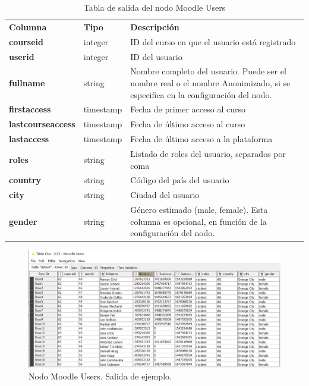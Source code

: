 \begin{table}[!h]
	\begin{center}
		\begin{tabular}{p{}p{}p{}}
			\toprule
			\textbf{Columna} & \textbf{Tipo} & \textbf{Descripción}\\
			\otoprule
			\textbf{courseid} & integer & ID del curso en que el usuario está registrado\\
         \hline
			\textbf{userid} & integer & ID del usuario \\
         \hline
         \textbf{fullname} & string & Nombre completo del usuario. Puede ser el nombre real o el nombre Anonimizado, si se especifica en la configuración del nodo. \\
         \hline
         \textbf{firstaccess} & timestamp & Fecha de primer acceso al curso \\
         \hline
         \textbf{lastcourseaccess} & timestamp &  Fecha de último acceso al curso\\
         \hline
         \textbf{lastaccess} & timestamp & Fecha de último acceso a la plataforma \\
         \hline
         \textbf{roles} & string & Listado de roles del usuario, separados por coma \\
         \hline
         \textbf{country} & string & Código del país del usuario \\
         \hline
         \textbf{city} & string & Ciudad del usuario \\
         \hline
         \textbf{gender} & string & Género estimado (male, female). Esta columna es opcional, en función de la configuración del nodo. \\
			\bottomrule
		\end{tabular}
	\end{center}
	\caption{Tabla de salida del nodo Moodle Users}
	\label{tab:moodle_users_desc}
\end{table}
\FloatBarrier

\begin{figure}[!h]
	\centering
	\includegraphics[width=1\textwidth]{img/nodes_moodle_users_output.png}
	\caption{Nodo Moodle Users. Salida de ejemplo. }
	\label{fig:moodleusers_output}
\end{figure}
\FloatBarrier
\hphantom{ }

